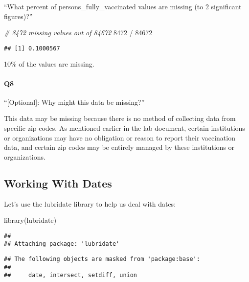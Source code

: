 \documentclass[
]{article}
\newenvironment{Shaded}{\begin{snugshade}}{\end{snugshade}}
\newcommand{\CommentTok}[1]{\textcolor[rgb]{0.56,0.35,0.01}{\textit{#1}}}
\newcommand{\DecValTok}[1]{\textcolor[rgb]{0.00,0.00,0.81}{#1}}
\newcommand{\FunctionTok}[1]{\textcolor[rgb]{0.00,0.00,0.00}{#1}}
\newcommand{\NormalTok}[1]{#1}
\newcommand{\SpecialCharTok}[1]{\textcolor[rgb]{0.00,0.00,0.00}{#1}}
\begin{document}
``What percent of persons\_fully\_vaccinated values are missing (to 2
significant figures)?''

\begin{Shaded}
\begin{Highlighting}[]
\CommentTok{\# 8472 missing values out of 84672}
\DecValTok{8472} \SpecialCharTok{/} \DecValTok{84672}
\end{Highlighting}
\end{Shaded}

\begin{verbatim}
## [1] 0.1000567
\end{verbatim}

10\% of the values are missing.

\hypertarget{q8}{%
\paragraph{Q8}\label{q8}}

``{[}Optional{]}: Why might this data be missing?''

This data may be missing because there is no method of collecting data
from specific zip codes. As mentioned earlier in the lab document,
certain institutions or organizations may have no obligation or reason
to report their vaccination data, and certain zip codes may be entirely
managed by these institutions or organizations.

\hypertarget{working-with-dates}{%
\subsection{Working With Dates}\label{working-with-dates}}

Let's use the lubridate library to help us deal with dates:

\begin{Shaded}
\begin{Highlighting}[]
\FunctionTok{library}\NormalTok{(lubridate)}
\end{Highlighting}
\end{Shaded}

\begin{verbatim}
## 
## Attaching package: 'lubridate'
\end{verbatim}

\begin{verbatim}
## The following objects are masked from 'package:base':
## 
##     date, intersect, setdiff, union
\end{verbatim}
\end{document}
